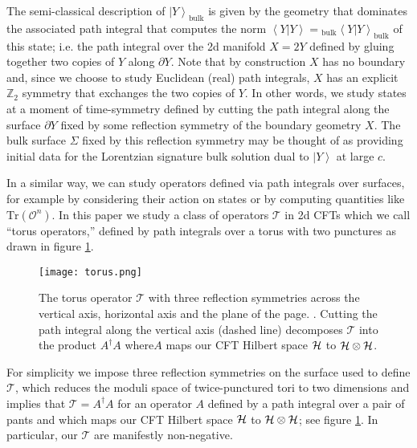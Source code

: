 \documentclass[letterpaper,12pt]{article}
\def\DM#1{{\color{red}{ [#1]}}}
\newcommand{\corr}[1]{\left< #1\right>}
\newcommand{\Tr}{\text{Tr}}
\newcommand{\ket}[1]{\left| #1\right>}
\begin{document}
The semi-classical description of $\ket {Y}_\text{bulk}$ is given by the geometry that dominates the associated path integral that computes the norm $\corr{{Y}|{Y}} = {}_\text{bulk}\corr{{Y}|{Y}}_\text{bulk}$ of this state; i.e. the path integral over the 2d manifold $X=2Y$ defined by gluing together two copies of ${Y}$ along $\partial {Y}$. Note that by construction $X$ has no boundary and, since we choose to study Euclidean (real) path integrals, $X$ has an explicit $\mathbb Z_2$ symmetry that exchanges the two copies of ${Y}$.  In other words, we study states at a moment of time-symmetry defined by cutting the path integral along the surface $\partial {Y}$ fixed by some reflection symmetry of the boundary geometry $X$. The bulk surface $\Sigma$ fixed by this reflection symmetry may be thought of as providing initial data for the Lorentzian signature bulk solution dual to $\ket Y$ at large $c$.

In a similar way, we can study operators defined via path integrals over surfaces, for example by considering their action on states or by computing quantities like $\Tr (\mathcal O^n)$. In this paper we study a class of operators $\mathcal T$ in 2d CFTs which we call ``torus operators,'' defined by path integrals over a torus with two punctures as drawn in figure \ref{fig:operator}.
\begin{figure}[ht!]
\centering
\texttt{[image: torus.png]}
\caption{
The torus operator $\mathcal T$ with three reflection symmetries across the vertical axis, horizontal axis and the plane of the page. \label{fig:operator}.  Cutting the path integral along the vertical axis (dashed line) decomposes $\mathcal T$ into the product $A^\dagger A$ where$ A$ maps our CFT Hilbert space ${\cal H}$ to   ${\cal H} \otimes  {\cal H}$. \DM{Add dashed vertical line.}
}
\end{figure}
For simplicity we impose three reflection symmetries on the surface used to define $\mathcal T$, which reduces the moduli space of twice-punctured tori to two dimensions and implies that $\mathcal T = A^\dagger A$ for an operator $A$ defined by a path integral over a pair of pants and which maps our CFT Hilbert space ${\cal H}$ to   ${\cal H} \otimes  {\cal H}$; see figure \ref{fig:operator}.  In particular, our $\mathcal T$ are manifestly non-negative.
\end{document}
